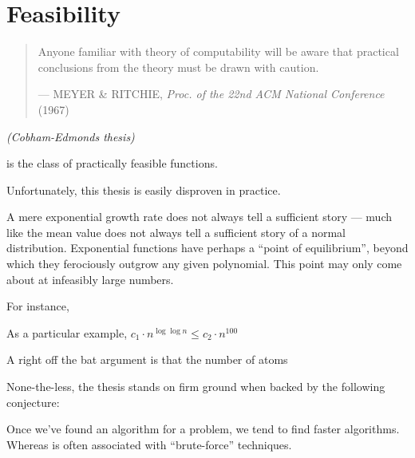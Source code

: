 \chapter{Feasibility}

\begin{quotation}

\footnotesize\sffamily\itshape

\begin{flushright}

Anyone familiar with theory of computability will be aware that practical
conclusions from the theory must be drawn with caution.

\smallbreak

\upshape

--- MEYER \& RITCHIE, \emph{Proc. of the 22nd ACM National Conference} (1967)

\end{flushright}

\end{quotation}

\begin{hypothesis} \emph{(Cobham-Edmonds thesis)}

\FPTIME{} is the class of practically feasible functions.

\end{hypothesis}

Unfortunately, this thesis is easily disproven in practice.

A mere exponential growth rate does not always tell a sufficient story --- much
like the mean value does not always tell a sufficient story of a normal
distribution.  Exponential functions have perhaps a ``point of equilibrium'',
beyond which they ferociously outgrow any given polynomial. This point may only
come about at infeasibly large numbers.

For instance, 

As a particular example, $c_1 \cdot n^{\log\log{n}} \leq c_2 \cdot n^{100}$

A right off the bat argument is that the number of atoms

None-the-less, the thesis stands on firm ground when backed by the following conjecture:

Once we've found an \PTIME{} algorithm for a problem, we tend to find faster
algorithms. Whereas \NPTIME{} is often associated with ``brute-force''
techniques.
